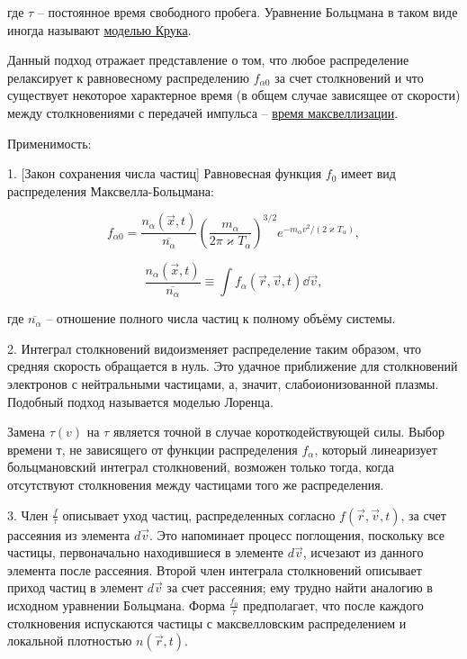 \documentclass[10pt, a4paper]{article}
\begin{document}
где $\tau$ -- постоянное время свободного пробега. Уравнение Больцмана в таком виде иногда называют \uline{моделью Крука}.

Данный подход отражает представление о том, что любое распределение
релаксирует к равновесному распределению $f_{\alpha 0}$ за счет столкновений и что существует некоторое характерное время (в общем случае зависящее от скорости) между столкновениями с передачей импульса -- \uline{время максвеллизации}.

Применимость:

1. [Закон сохранения числа частиц] Равновесная функция $f_0$ имеет вид распределения Максвелла-Больцмана:

\begin{equation*}
	f_{\alpha 0} = \frac{n_\alpha(\vec{x}, t)}{\overline{n_\alpha}} \left( \frac{m_\alpha}{2\pi \varkappa T_\alpha}\right)^{3/2}e^{-m_\alpha v^2/(2\varkappa T_\alpha)}, 
\end{equation*}

\begin{equation*}
	\frac{n_\alpha(\vec{x}, t)}{\overline{n_\alpha}} \equiv \int f_\alpha (\vec{r}, \vec{v}, t) \dd\vec{v},
\end{equation*}

где $\overline{n_\alpha}$ -- отношение полного числа частиц к полному объёму системы.

2. Интеграл столкновений видоизменяет распределение таким
образом, что средняя скорость обращается в нуль. Это удачное приближение для столкновений электронов с нейтральными частицами, а, значит, слабоионизованной плазмы. Подобный подход называется моделью Лоренца.

Замена $\tau(v)$ на $\tau$ является точной в случае короткодействующей силы. Выбор времени т, не зависящего от функции распределения $f_\alpha$, который линеаризует больцмановский интеграл
столкновений, возможен только тогда, когда отсутствуют столкновения
между частицами того же распределения.

3. Член $\frac{f}{\tau}$ описывает уход частиц, распределенных согласно
$f(\vec{r}, \vec{v}, t)$, за счет рассеяния из элемента $d\vec{v}$. Это напоминает процесс поглощения, поскольку все частицы, первоначально находившиеся в элементе $d\vec{v}$, исчезают из данного элемента после рассеяния. Второй член интеграла столкновений описывает приход частиц в элемент $d\vec{v}$ за счет рассеяния;
ему трудно найти аналогию в исходном уравнении Больцмана. Форма $\frac{f_0}{\tau}$ предполагает, что после каждого столкновения испускаются частицы с максвелловским распределением и локальной плотностью $n(\vec{r}, t)$.
\end{document}
